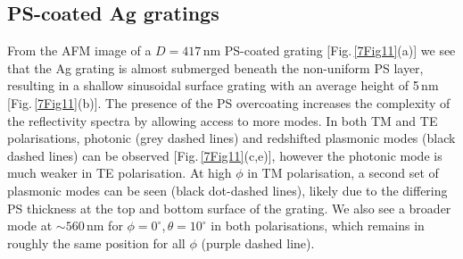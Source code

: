 \subsection{PS-coated Ag gratings}
From the AFM image of a $D=417$\,nm PS-coated grating [Fig.\,\ref{7Fig11}(a)] we see that the Ag grating is almost submerged beneath the non-uniform PS layer, resulting in a shallow sinusoidal surface grating with an average height of 5\,nm [Fig.\,\ref{7Fig11}(b)]. The presence of the PS overcoating increases the complexity of the reflectivity spectra by allowing access to more modes. In both TM and TE polarisations, photonic (grey dashed lines) and redshifted plasmonic modes (black dashed lines) can be observed [Fig.\,\ref{7Fig11}(c,e)], however the photonic mode is much weaker in TE polarisation. At high $\phi$ in TM polarisation, a second set of plasmonic modes can be seen (black dot-dashed lines), likely due to the differing PS thickness at the top and bottom surface of the grating. We also see a broader mode at $\sim560$\,nm for $\phi=0^{\circ}$,\,$\theta=10^{\circ}$ in both polarisations, which remains in roughly the same position for all $\phi$ (purple dashed line).

